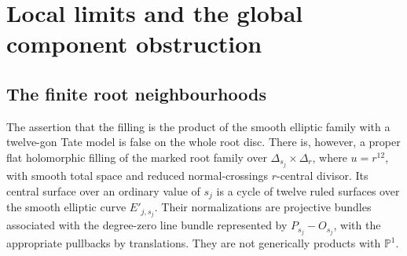 \section{Local limits and the global component obstruction}\label{push:section:B}
\subsection{The finite root neighbourhoods}\label{push:section:B.1}

\begin{proposition}\label{push:src:B.1.1}\label{push:B11}
The assertion that the filling is the product of the smooth elliptic
family with a twelve-gon Tate model is false on the whole root disc. There is, however, a proper flat holomorphic filling of
the marked root family over
$\Delta_{s_j}\times\Delta_r$, where $u=r^{12}$, with smooth
total space and reduced normal-crossings $r$-central divisor.
Its central surface over an ordinary value of $s_j$ is a cycle
of twelve ruled surfaces over the smooth elliptic curve
$E'_{j,s_j}$. Their normalizations are projective bundles
associated with the degree-zero line bundle represented by
$P_{s_j}-O_{s_j}$, with the appropriate pullbacks by translations.
They are not generically products with $\mathbb P^1$.
\end{proposition}


